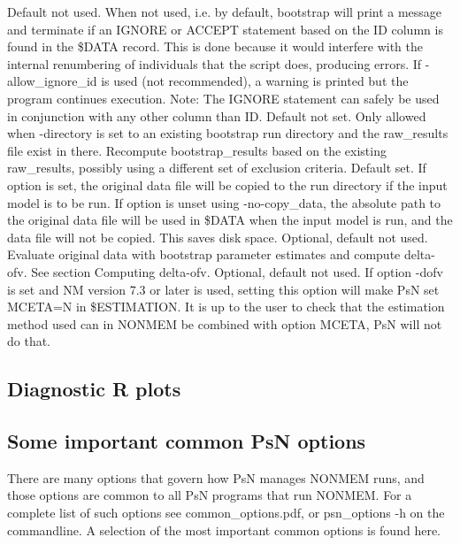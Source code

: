 \begin{optionlist}
Default not used. When not used, i.e. by default, bootstrap will print a message and terminate if an IGNORE or ACCEPT statement based on the ID column is found in the \$DATA record. This is done because it would interfere with the internal renumbering of individuals that the script does, producing errors. If -allow\_ignore\_id is used (not recommended), a warning is printed but the program continues execution. Note: The IGNORE statement can safely be used in conjunction with any other column than ID. 
\nextopt
{}
Default not set. Only allowed when -directory is set to an existing bootstrap run directory and
the raw\_results file exist in there. Recompute bootstrap\_results based on the existing raw\_results,
possibly using a different set of exclusion criteria.
\nextopt
{}
Default set. If option is set, the original data file
will be copied to the run directory if the input model is to be run.
If option is unset using -no-copy\_data, the absolute path to the original data file will be used in
\$DATA when the input model is run, and the data file will not be copied. This saves disk space.
\nextopt
{}
Optional, default not used. Evaluate original data with bootstrap parameter estimates and compute delta-ofv. See section Computing delta-ofv. 
\nextopt
{}
Optional, default not used. If option -dofv is set and NM version 7.3 or later is used, setting this option will make PsN set MCETA=N in \$ESTIMATION. It is up to the user to check that the estimation method used can in NONMEM be combined with option MCETA, PsN will not do that. 
\nextopt
\end{optionlist}

\subsection{Diagnostic R plots}
\newcommand{\rplotsconditions}{
See section Output, subsections Basic and Extended plots,
for descriptions of the default bootstrap plots.
The default bootstrap template 
requires the xpose4 R library of at least version 4.5.0,
and that R libraries ggplot2, plyr, dplyr are installed.
If the conditions are not fulfilled then no pdf will be generated,
see the .Rout file in the main run directory for error messages.
}


\subsection{Some important common PsN options}
There are many options that govern how PsN manages NONMEM runs, and
those options are common to all PsN programs that run NONMEM.
For a complete list of such options see common\_options.pdf, 
or psn\_options -h on the commandline. A selection of
the most important common options is found here.



